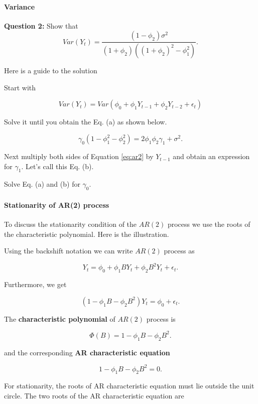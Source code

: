 \documentclass[]{book}
\let\oldparagraph\paragraph
\renewcommand{\paragraph}[1]{\oldparagraph{#1}\mbox{}}
\begin{document}
\hypertarget{variance}{%
\paragraph{Variance}\label{variance}}

\textbf{Question 2:} Show that \[Var(Y_t) = \frac{(1-\phi_2)\sigma^2}{(1+\phi_2)((1+\phi_2)^2-\phi_1^2)}.\]

Here is a guide to the solution

Start with

\[Var(Y_t)=Var(\phi_0+\phi_1Y_{t-1}+\phi_2Y_{t-2}+\epsilon_t)\]

Solve it until you obtain the Eq. (a) as shown below.

\begin{equation}
\tag{a}
\gamma_0 (1-\phi_1^2 - \phi_2^2) = 2\phi_1\phi_2\gamma_1+\sigma^2.
\end{equation}

Next multiply both sides of Equation \eqref{eq:ar2} by \(Y_{t-1}\) and obtain an expression for \(\gamma_1\). Let's call this Eq. (b).

Solve Eq. (a) and (b) for \(\gamma_0.\)

\hypertarget{stationarity-of-ar2-process}{%
\paragraph{Stationarity of AR(2) process}\label{stationarity-of-ar2-process}}

To discuss the stationarity condition of the \(AR(2)\) process we use the roots of the characteristic polynomial. Here is the illustration.

Using the backshift notation we can write \(AR(2)\) process as

\[Y_t = \phi_0 + \phi_1 BY_{t} + \phi_2 B^2 Y_{t} + \epsilon_t.\]

Furthermore, we get

\[(1-\phi_1 B - \phi_2 B^2) Y_t = \phi_0 + \epsilon_t.\]

The \textbf{characteristic polynomial} of \(AR(2)\) process is

\[\Phi(B)=1-\phi_1 B - \phi_2 B^2.\]

and the corresponding \textbf{AR characteristic equation}

\[1-\phi_1 B - \phi_2 B^2=0.\]

For stationarity, the roots of AR characteristic equation must lie outside the unit circle. The two roots of the AR characteristic equation are
\end{document}
